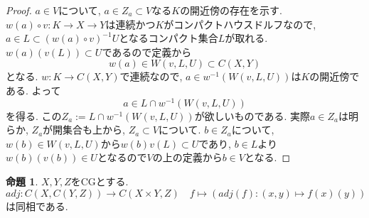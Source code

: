 \documentclass[dvipdfmx,a4paper,11pt]{article}
\theoremstyle{definition}
\newtheorem{prop}[thm]{命題}
\begin{document}
\begin{proof}
 $a \in V$について, $a \in Z_a \subset V$なる$K$の開近傍の存在を示す. 
 $w(a) \circ v : K \to X \to Y$は連続かつ$K$がコンパクトハウスドルフなので, 
 $a \in L \subset (w(a) \circ v)^{-1}U $となるコンパクト集合$L$が取れる.
 $w(a)(v(L)) \subset U$であるので定義から
 $$
 w(a) \in W(v,L,U) \subset C(X,Y)
 $$
 となる. 
 $w : K \to C(X,Y)$で連続なので, $a \in w^{-1}(W(v,L,U))$は$K$の開近傍である.
 よって
 $$
 a \in L \cap w^{-1}(W(v,L,U))
 $$
 を得る. この$Z_a := L \cap w^{-1}(W(v,L,U))$が欲しいものである.
 実際$a \in Z_a$は明らか, $Z_a$が開集合も上から, $ Z_a\subset V$について. 
 $b \in Z_a$について,$w(b) \in W(v,L,U) $から$w(b) v(L) \subset U$であり, $b \in L$より
 $w(b)(v(b)) \in U$となるので$V$の上の定義から$b \in V$となる.
\end{proof}

 \begin{tcolorbox}
 [colback = white, colframe = green!35!black, fonttitle = \bfseries,breakable = true]
\begin{prop}\cite[Prop2.１2]{Str}
\label{Str-prop2.12}
$X,Y,Z$をCGとする. 
$$
adj: C(X, C(Y,Z)) \to C(X \times Y, Z)  \quad f \mapsto (adj(f) : (x,y) \mapsto f(x)(y))
$$
は同相である. 
\end{prop}
\end{tcolorbox}
\end{document}
